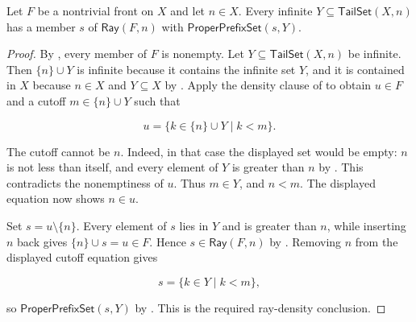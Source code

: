 \begin{helper}
Let $F$ be a nontrivial front on $X$ and let $n\in X$.  Every infinite
$Y\subseteq\mathsf{TailSet}(X,n)$ has a member $s$ of $\mathsf{Ray}(F,n)$
with $\mathsf{ProperPrefixSet}(s,Y)$.
\end{helper}
\begin{proof}
By , every member of $F$ is nonempty.  Let
$Y\subseteq\mathsf{TailSet}(X,n)$ be infinite.  Then
$\{n\}\cup Y$ is infinite because it contains the infinite set $Y$, and
it is contained in $X$ because $n\in X$ and $Y\subseteq X$ by
.  Apply the density clause of  to obtain
$u\in F$ and a cutoff $m\in\{n\}\cup Y$ such that

\[
u=\{k\in\{n\}\cup Y\mid k<m\}.
\]

The cutoff cannot be $n$.  Indeed, in that case the displayed set would
be empty: $n$ is not less than itself, and every element of $Y$ is greater
than $n$ by .  This contradicts the nonemptiness of $u$.
Thus $m\in Y$, and $n<m$.  The displayed equation now shows $n\in u$.

Set $s=u\setminus\{n\}$.  Every element of $s$ lies in $Y$ and is greater
than $n$, while inserting $n$ back gives $\{n\}\cup s=u\in F$.  Hence
$s\in\mathsf{Ray}(F,n)$ by .  Removing $n$ from the displayed
cutoff equation gives

\[
s=\{k\in Y\mid k<m\},
\]

so $\mathsf{ProperPrefixSet}(s,Y)$ by .  This is
the required ray-density conclusion.
\end{proof}
